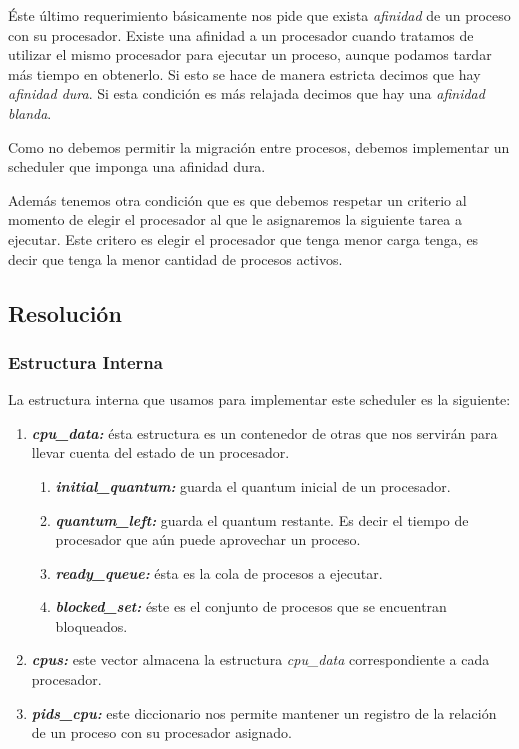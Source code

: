 \documentclass[a4paper,11pt]{article}
\begin{document}
		Éste último requerimiento básicamente nos pide que exista \emph{afinidad} de un proceso con su procesador.
		Existe una afinidad a un procesador cuando tratamos de utilizar el mismo procesador para ejecutar un proceso, aunque podamos tardar más tiempo en obtenerlo. Si esto se hace de manera estricta decimos que hay \emph{afinidad dura}. Si esta condición es más relajada decimos que hay una \emph{afinidad blanda}.
		
		Como no debemos permitir la migración entre procesos, debemos implementar un scheduler que imponga una afinidad dura.
		
		Además tenemos otra condición que es que debemos respetar un criterio al momento de elegir el procesador al que le asignaremos la siguiente tarea a ejecutar. Este critero es elegir el procesador que tenga menor carga tenga, es decir que tenga la menor cantidad de procesos activos.
		
	\subsection{Resolución}
		\subsubsection*{Estructura Interna}
			La estructura interna que usamos para implementar este scheduler es la siguiente:

			
			
			\begin{enumerate}
				\item \emph{\textbf{cpu\_data:}} ésta estructura es un contenedor de otras que nos servirán para llevar cuenta del estado de un procesador.
				\begin{enumerate}
					\item \emph{\textbf{initial\_quantum:}} guarda el quantum inicial de un procesador.
					\item \emph{\textbf{quantum\_left:}} guarda el quantum restante. Es decir el tiempo de procesador que aún puede aprovechar un proceso.
					\item \emph{\textbf{ready\_queue:}} ésta es la cola de procesos a ejecutar.
					\item \emph{\textbf{blocked\_set:}} éste es el conjunto de procesos que se encuentran bloqueados.
				\end{enumerate}
				\item \emph{\textbf{cpus:}} este vector almacena la estructura \textit{cpu\_data} correspondiente a cada procesador.
				\item \emph{\textbf{pids\_cpu:}} este diccionario nos permite mantener un registro de la relación de un proceso con su procesador asignado.
			\end{enumerate}
			
\end{document}
